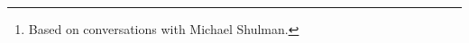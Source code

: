 \documentclass[oneside,a4paper]{article}
\title{#1}
\begin{document}
\author{Jonathan Sterling\thanks{Based on conversations with Michael Shulman.}}



\printbibliography
\end{document}
